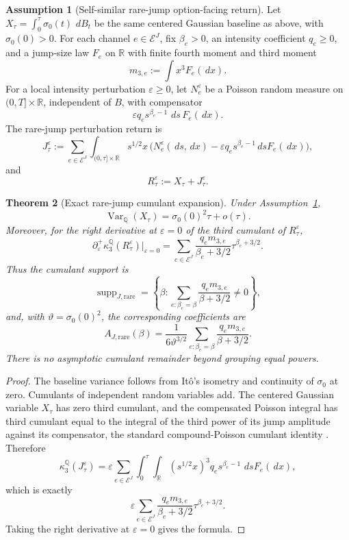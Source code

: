 \documentclass[11pt,a4paper]{amsart}
\theoremstyle{plain}
\newtheorem{theorem}{Theorem}[section]
\theoremstyle{definition}
\newtheorem{assumption}[theorem]{Assumption}
\theoremstyle{remark}
\DeclareMathOperator{\Var}{Var}
\newcommand{\R}{\mathbb{R}}
\newcommand{\QQ}{\mathbb{Q}}
\newcommand{\cE}{\mathcal{E}}
\newcommand{\dd}{\,d}
\begin{document}
\begin{assumption}[Self-similar rare-jump option-facing return]\label{ass:rare-jump}
Let \(X_\tau=\int_0^\tau\sigma_0(t)\,\dd B_t\) be the same centered Gaussian baseline as above,
with \(\sigma_0(0)>0\).  For each channel \(e\in\cE^J\), fix \(\beta_e>0\), an intensity
coefficient \(q_e\ge0\), and a jump-size law \(F_e\) on \(\R\) with finite fourth moment and third
moment
\[
        m_{3,e}:=\int x^3F_e(\dd x).
\]
For a local intensity perturbation \(\varepsilon\ge0\), let \(N_e^\varepsilon\) be a Poisson random
measure on \((0,T]\times\R\), independent of \(B\), with compensator
\[
        \varepsilon q_e s^{\beta_e-1}\,\dd s\,F_e(\dd x).
\]
The rare-jump perturbation return is
\[
        J_\tau^\varepsilon
        :=
        \sum_{e\in\cE^J}\int_{(0,\tau]\times\R}s^{1/2}x\,
        \bigl(N_e^\varepsilon(\dd s,\dd x)-\varepsilon q_e s^{\beta_e-1}\dd sF_e(\dd x)\bigr),
\]
and
\[
        R_\tau^\varepsilon:=X_\tau+J_\tau^\varepsilon.
\]
\end{assumption}

\begin{theorem}[Exact rare-jump cumulant expansion]\label{thm:rare-jump-cumulants}
Under Assumption~\ref{ass:rare-jump},
\[
        \Var_\QQ(X_\tau)=\sigma_0(0)^2\tau+o(\tau).
\]
Moreover, for the right derivative at \(\varepsilon=0\) of the third cumulant of
\(R_\tau^\varepsilon\),
\[
        \partial_\varepsilon^+\kappa_3^\QQ(R_\tau^\varepsilon)\big|_{\varepsilon=0}
        =
        \sum_{e\in\cE^J}
        \frac{q_em_{3,e}}{\beta_e+3/2}\tau^{\beta_e+3/2}.
\]
Thus the cumulant support is
\[
        \operatorname{supp}_{J,\mathrm{rare}}
        =
        \left\{
        \beta:\sum_{e:\beta_e=\beta}\frac{q_em_{3,e}}{\beta+3/2}\ne0
        \right\},
\]
and, with \(\vartheta=\sigma_0(0)^2\), the corresponding coefficients are
\[
        A_{J,\mathrm{rare}}(\beta)
        =
        \frac{1}{6\vartheta^{3/2}}
        \sum_{e:\beta_e=\beta}\frac{q_em_{3,e}}{\beta+3/2}.
\]
There is no asymptotic cumulant remainder beyond grouping equal powers.
\end{theorem}

\begin{proof}
The baseline variance follows from It\^o's isometry and continuity of \(\sigma_0\) at zero.  Cumulants of
independent random variables add.  The centered Gaussian variable \(X_\tau\) has zero third
cumulant, and the compensated Poisson integral has third cumulant equal to the integral of the
third power of its jump amplitude against its compensator, the standard compound-Poisson cumulant
identity \cite{sato1999levy,contTankov2004jumps}.  Therefore
\[
        \kappa_3^\QQ(J_\tau^\varepsilon)
        =
        \varepsilon
        \sum_{e\in\cE^J}\int_0^\tau\int_\R (s^{1/2}x)^3
        q_es^{\beta_e-1}\,\dd sF_e(\dd x),
\]
which is exactly
\[
        \varepsilon
        \sum_{e\in\cE^J}\frac{q_em_{3,e}}{\beta_e+3/2}\tau^{\beta_e+3/2}.
\]
Taking the right derivative at \(\varepsilon=0\) gives the formula.
\end{proof}
\end{document}
